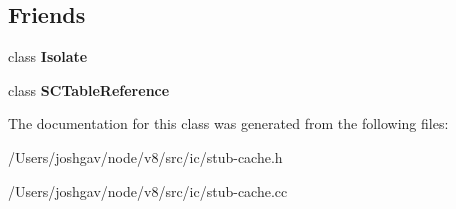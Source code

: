 \subsection*{Friends}
\begin{DoxyCompactItemize}
\item 
class {\bfseries Isolate}\hypertarget{classv8_1_1internal_1_1_stub_cache_aba4f0964bdacf2bbf62cf876e5d28d0a}{}\label{classv8_1_1internal_1_1_stub_cache_aba4f0964bdacf2bbf62cf876e5d28d0a}

\item 
class {\bfseries S\+C\+Table\+Reference}\hypertarget{classv8_1_1internal_1_1_stub_cache_ad842275e288fccee190c3166f1bc3eed}{}\label{classv8_1_1internal_1_1_stub_cache_ad842275e288fccee190c3166f1bc3eed}

\end{DoxyCompactItemize}


The documentation for this class was generated from the following files\+:\begin{DoxyCompactItemize}
\item 
/\+Users/joshgav/node/v8/src/ic/stub-\/cache.\+h\item 
/\+Users/joshgav/node/v8/src/ic/stub-\/cache.\+cc\end{DoxyCompactItemize}
